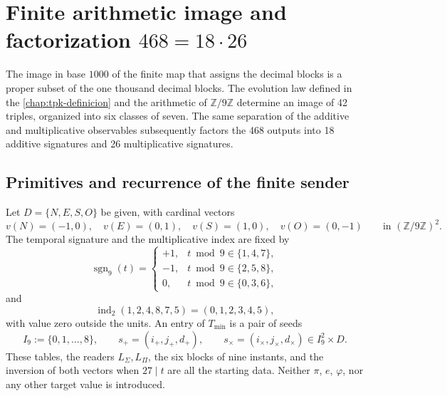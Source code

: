 \chapter[Finite arithmetic image and factorization \(468=18\cdot26\)]{Finite arithmetic image and factorization \(468=18\cdot26\)}
\label{chap:alfabeto-42}

The image in base \(1000\) of the finite map that assigns the decimal blocks is a
proper subset of the one thousand decimal blocks. The evolution law defined in the
\cref{chap:tpk-definicion} and the arithmetic of \(\mathbb Z/9\mathbb Z\)
determine an image of 42 triples, organized into six classes of seven. The
same separation of the additive and multiplicative observables subsequently factors the 468
outputs into 18 additive signatures and 26 multiplicative signatures.

\section{Primitives and recurrence of the finite sender}

\begin{definition}
\label{pf84:E02-15}
Let \(D=\{N,E,S,O\}\) be given, with cardinal vectors
\[
 v(N)=(-1,0),\quad v(E)=(0,1),\quad
 v(S)=(1,0),\quad v(O)=(0,-1)
 \qquad\text{in }(\mathbb Z/9\mathbb Z)^2.
\]
The temporal signature and the multiplicative index are fixed by
\[
 \operatorname{sgn}_9(t)=
 \begin{cases}
 +1,&t\bmod9\in\{1,4,7\},\\
 -1,&t\bmod9\in\{2,5,8\},\\
 0,&t\bmod9\in\{0,3,6\},
 \end{cases}
\]
and
\[
 \operatorname{ind}_2(1,2,4,8,7,5)=(0,1,2,3,4,5),
\]
with value zero outside the units. An entry of \(T_{\min}\) is a pair
of seeds
\[
 I_9:=\{0,1,\ldots,8\},\qquad
 s_+=(i_+,j_+,d_+),\qquad s_\times=(i_\times,j_\times,d_\times)
 \in I_9^2\times D.
\]
These tables, the readers \(L_\Sigma,L_\Pi\), the six blocks of nine
instants, and the inversion of both vectors when \(27\mid t\) are all the
starting data. Neither \(\pi\), \(e\), \(\varphi\), nor any other
target value is introduced.
\end{definition}


